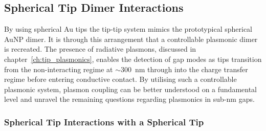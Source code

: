 \documentclass[a4paper]{article}
\begin{document}
\subsection{Spherical Tip Dimer Interactions}

By using spherical Au tips the tip-tip system mimics the prototypical spherical AuNP dimer. It is through this  arrangement that a controllable plasmonic dimer is recreated. The presence of radiative plasmons, discussed in chapter~\ref{ch:tip_plasmonics}, enables the detection of gap modes as tips transition from the non-interacting regime at $\sim$\SI{300}{nm} through into the charge transfer regime before entering conductive contact. By utilising such a controllable plasmonic system, plasmon coupling can be better understood on a fundamental level and unravel the remaining questions regarding plasmonics in sub-nm gaps.

\subsubsection{Spherical Tip Interactions with a Spherical Tip}
\end{document}
